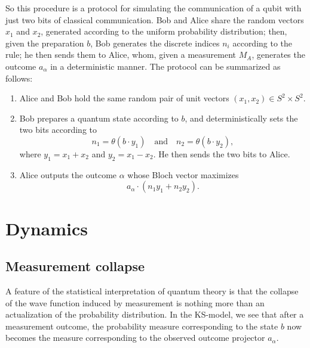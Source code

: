 \documentclass[12pt,draft]{article}
\theoremstyle{definition}
\theoremstyle{plain}
\begin{document}
    So this procedure is a protocol for simulating the
    communication of a qubit with just two bits of classical
    communication. {\color{blue}
        Bob and Alice share the random vectors $x_1$
        and $x_2$, generated according to the uniform
        probability distribution; then, given the
        preparation $b$, Bob generates the discrete indices
        $n_i$ according to the rule; he then sends them to
        Alice, whom, given a measurement $M_A$, generates
        the outcome $a_\alpha$ in a deterministic manner.
    } The protocol can be summarized as follows:
    \begin{enumerate}
        \item Alice and Bob hold the same random pair of
            unit vectors $(x_1, x_2) \in S^2
            \times S^2$.
        \item Bob prepares a quantum state according to
            $b$, and deterministically sets the two
            bits according to
            \begin{equation}
                n_1 = \theta(b \cdot y_1)
                \quad\text{and}\quad
                n_2 = \theta(b \cdot y_2),
            \end{equation}
            where $y_1 = x_1 + x_2$ and $
            y_2 = x_1 - x_2$. He then sends the
            two bits to Alice.
        \item Alice outputs the outcome $\alpha$ whose Bloch
            vector maximizes 
            \begin{equation}
                a_\alpha \cdot (n_1 y_1 + n_2 y_2).
            \end{equation}
    \end{enumerate}


    \section{Dynamics}

    \subsection{Measurement collapse}

    A feature of the statistical interpretation of quantum
    theory is that the collapse of the wave function induced
    by measurement is nothing more than an actualization of
    the probability distribution. In the KS-model, we see
    that after a measurement outcome, the probability
    measure corresponding to the state $b$ now becomes the
    measure corresponding to the observed outcome projector
    $a_\alpha$.
\end{document}
